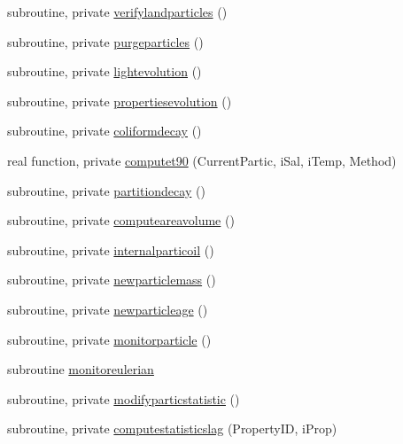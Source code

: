 \begin{DoxyCompactItemize}
\item 
subroutine, private \mbox{\hyperlink{namespacemodulelagrangian_a96db0d2ce32abc9c42eea8890f665798}{verifylandparticles}} ()
\item 
subroutine, private \mbox{\hyperlink{namespacemodulelagrangian_a4ad3bdd3ff9c81a87e1b11eeea429acd}{purgeparticles}} ()
\item 
subroutine, private \mbox{\hyperlink{namespacemodulelagrangian_aba461e3f5d94c00b11072bae66f32060}{lightevolution}} ()
\item 
subroutine, private \mbox{\hyperlink{namespacemodulelagrangian_ad1d58143078dee3bc7c85e4ca9c03197}{propertiesevolution}} ()
\item 
subroutine, private \mbox{\hyperlink{namespacemodulelagrangian_a24e84b1ba147f10917d0d3cd3564d191}{coliformdecay}} ()
\item 
real function, private \mbox{\hyperlink{namespacemodulelagrangian_ab2c379c41effe9b3eef3129449039ace}{computet90}} (Current\+Partic, i\+Sal, i\+Temp, Method)
\item 
subroutine, private \mbox{\hyperlink{namespacemodulelagrangian_ad1541366b9db02d7a143f29f81d45a3d}{partitiondecay}} ()
\item 
subroutine, private \mbox{\hyperlink{namespacemodulelagrangian_a5a4818cc1397ad3373693bc882af863f}{computeareavolume}} ()
\item 
subroutine, private \mbox{\hyperlink{namespacemodulelagrangian_a370ee1f0e073c2f783b4f91c7aee40f1}{internalparticoil}} ()
\item 
subroutine, private \mbox{\hyperlink{namespacemodulelagrangian_a5afe5f1c46e068854f5c2eca0de8b0fb}{newparticlemass}} ()
\item 
subroutine, private \mbox{\hyperlink{namespacemodulelagrangian_a05769d5d8e2cad0d654788eda4c8830e}{newparticleage}} ()
\item 
subroutine, private \mbox{\hyperlink{namespacemodulelagrangian_a71a2aeb4e1c33422d4189e27f77e15e6}{monitorparticle}} ()
\item 
subroutine \mbox{\hyperlink{namespacemodulelagrangian_ad6a4bcc42c67f187fb3a812f39b8c751}{monitoreulerian}}
\item 
subroutine, private \mbox{\hyperlink{namespacemodulelagrangian_a101763d65fb26cd32c402a807ae7c733}{modifyparticstatistic}} ()
\item 
subroutine, private \mbox{\hyperlink{namespacemodulelagrangian_afbe53c51100e0ccf05c86c57cde70d49}{computestatisticslag}} (Property\+ID, i\+Prop)
\item 

\end{DoxyCompactItemize}
